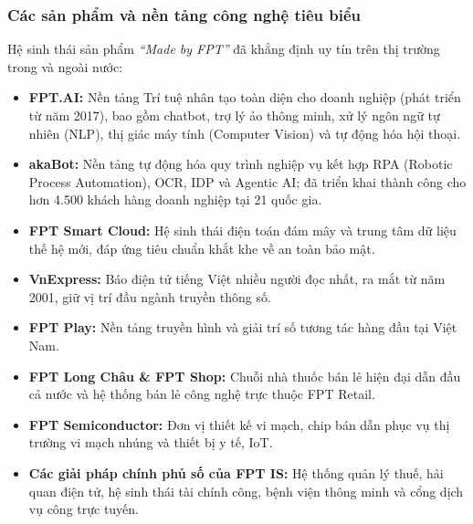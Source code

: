 \subsubsection{Các sản phẩm và nền tảng công nghệ tiêu biểu}
Hệ sinh thái sản phẩm \textit{``Made by FPT''} đã khẳng định uy tín trên thị trường trong và ngoài nước:
\begin{itemize}
    \item \textbf{FPT.AI:} Nền tảng Trí tuệ nhân tạo toàn diện cho doanh nghiệp (phát triển từ năm 2017), bao gồm chatbot, trợ lý ảo thông minh, xử lý ngôn ngữ tự nhiên (NLP), thị giác máy tính (Computer Vision) và tự động hóa hội thoại.
    \item \textbf{akaBot:} Nền tảng tự động hóa quy trình nghiệp vụ kết hợp RPA (Robotic Process Automation), OCR, IDP và Agentic AI; đã triển khai thành công cho hơn 4.500 khách hàng doanh nghiệp tại 21 quốc gia.
    \item \textbf{FPT Smart Cloud:} Hệ sinh thái điện toán đám mây và trung tâm dữ liệu thế hệ mới, đáp ứng tiêu chuẩn khắt khe về an toàn bảo mật.
    \item \textbf{VnExpress:} Báo điện tử tiếng Việt nhiều người đọc nhất, ra mắt từ năm 2001, giữ vị trí đầu ngành truyền thông số.
    \item \textbf{FPT Play:} Nền tảng truyền hình và giải trí số tương tác hàng đầu tại Việt Nam.
    \item \textbf{FPT Long Châu \& FPT Shop:} Chuỗi nhà thuốc bán lẻ hiện đại dẫn đầu cả nước và hệ thống bán lẻ công nghệ trực thuộc FPT Retail.
    \item \textbf{FPT Semiconductor:} Đơn vị thiết kế vi mạch, chip bán dẫn phục vụ thị trường vi mạch nhúng và thiết bị y tế, IoT.
    \item \textbf{Các giải pháp chính phủ số của FPT IS:} Hệ thống quản lý thuế, hải quan điện tử, hệ sinh thái tài chính công, bệnh viện thông minh và cổng dịch vụ công trực tuyến.
\end{itemize}

